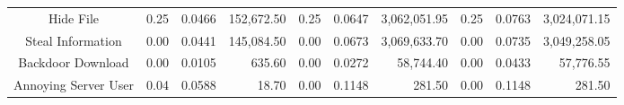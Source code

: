 \begin{table*}[t]
{\begin{tabular}{crrrrrrrrr}
Hide File            & 0.25                                                              & 0.0466                                                              & 152,672.50                                                          & 0.25                                                              & 0.0647                                                              & 3,062,051.95                                                        & 0.25                                                              & 0.0763                                                              & 3,024,071.15                                                        \\ 
Steal Information    & 0.00                                                              & 0.0441                                                              & 145,084.50                                                          & 0.00                                                              & 0.0673                                                              & 3,069,633.70                                                        & 0.00                                                              & 0.0735                                                              & 3,049,258.05                                                        \\ 
Backdoor Download    & 0.00                                                              & 0.0105                                                              & 635.60                                                              & 0.00                                                              & 0.0272                                                              & 58,744.40                                                           & 0.00                                                              & 0.0433                                                              & 57,776.55                                                           \\ 
Annoying Server User & 0.04                                                              & 0.0588                                                              & 18.70                                                               & 0.00                                                              & 0.1148                                                              & 281.50                                                              & 0.00                                                              & 0.1148                                                             & 281.50                                                              \\ 

\end{tabular}}
\end{table*}
